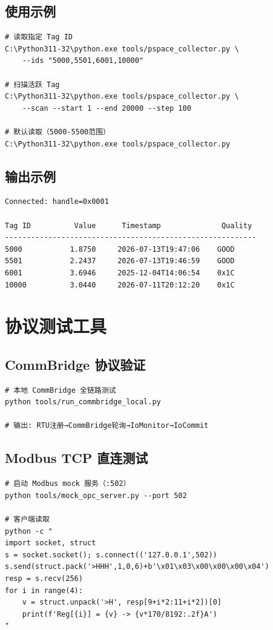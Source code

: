 \documentclass[12pt,a4paper]{ctexart}
\begin{document}
\subsection{使用示例}
\begin{lstlisting}
# 读取指定 Tag ID
C:\Python311-32\python.exe tools/pspace_collector.py \
    --ids "5000,5501,6001,10000"

# 扫描活跃 Tag
C:\Python311-32\python.exe tools/pspace_collector.py \
    --scan --start 1 --end 20000 --step 100

# 默认读取（5000-5500范围）
C:\Python311-32\python.exe tools/pspace_collector.py
\end{lstlisting}

\subsection{输出示例}
\begin{verbatim}
Connected: handle=0x0001

Tag ID          Value      Timestamp              Quality
----------------------------------------------------------
5000           1.8750     2026-07-13T19:47:06    GOOD
5501           2.2437     2026-07-13T19:46:59    GOOD
6001           3.6946     2025-12-04T14:06:54    0x1C
10000          3.0440     2026-07-11T20:12:20    0x1C
\end{verbatim}

\section{协议测试工具}

\subsection{CommBridge 协议验证}
\begin{lstlisting}
# 本地 CommBridge 全链路测试
python tools/run_commbridge_local.py

# 输出: RTU注册→CommBridge轮询→IoMonitor→IoCommit
\end{lstlisting}

\subsection{Modbus TCP 直连测试}
\begin{lstlisting}
# 启动 Modbus mock 服务（:502）
python tools/mock_opc_server.py --port 502

# 客户端读取
python -c "
import socket, struct
s = socket.socket(); s.connect(('127.0.0.1',502))
s.send(struct.pack('>HHH',1,0,6)+b'\x01\x03\x00\x00\x00\x04')
resp = s.recv(256)
for i in range(4):
    v = struct.unpack('>H', resp[9+i*2:11+i*2])[0]
    print(f'Reg[{i}] = {v} -> {v*170/8192:.2f}A')
"
\end{lstlisting}
\end{document}
